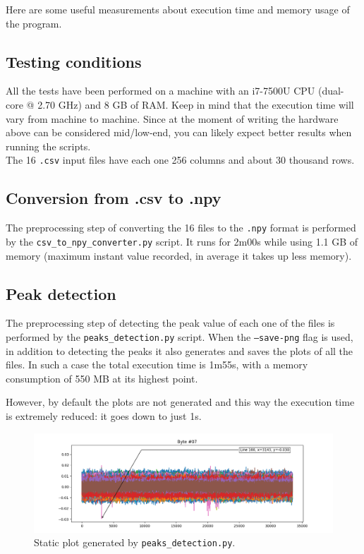 \documentclass[11pt,a4paper]{article}
\begin{document}
Here are some useful measurements about execution time and memory usage of the program.

\subsection{Testing conditions}

All the tests have been performed on a machine with an i7-7500U CPU (dual-core @ 2.70 GHz) and 8 GB of RAM.
Keep in mind that the execution time will vary from machine to machine.
Since at the moment of writing the hardware above can be considered mid/low-end, you can likely expect better results when running the scripts.\\

The 16 \texttt{.csv} input files have each one 256 columns and about 30 thousand rows.

\subsection{Conversion from .csv to .npy}

The preprocessing step of converting the 16 files to the \texttt{.npy} format is performed by the \texttt{csv\_to\_npy\_converter.py} script.
It runs for 2m00s while using 1.1 GB of memory (maximum instant value recorded, in average it takes up less memory).

\subsection{Peak detection}

The preprocessing step of detecting the peak value of each one of the files is performed by the \texttt{peaks\_detection.py} script.
When the \texttt{--save-png} flag is used, in addition to detecting the peaks it also generates and saves the plots of all the files.
In such a case the total execution time is 1m55s, with a memory consumption of 550 MB at its highest point.

However, by default the plots are not generated and this way the execution time is extremely reduced: it goes down to just 1s.

\begin{figure}[H]
    \centering
    \includegraphics[scale=0.55]{static_plot.png}
    \caption{Static plot generated by \texttt{peaks\_detection.py}.}
    \label{fig:static_plot}
\end{figure}
\end{document}
